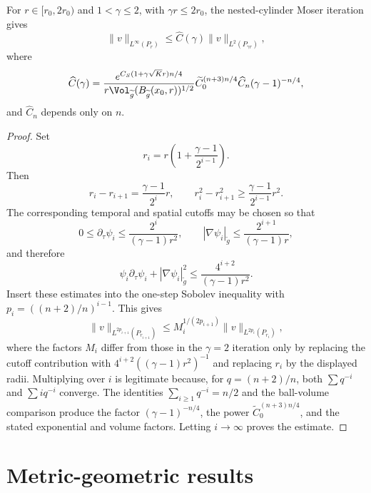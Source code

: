 \begin{proposition}
\label{prop:chow-iii-appj-solution-25-7}
For \(r\in[r_0,2r_0)\) and \(1<\gamma\leq2\), with
\(\gamma r\leq2r_0\), the nested-cylinder Moser iteration gives
\[
 \|v\|_{L^\infty(P_r)}\leq\widehat C(\gamma)
 \|v\|_{L^2(P_{\gamma r})},
\]
where
\[
 \widehat C(\gamma)=
 \frac{e^{C_S(1+\gamma\sqrt K r)n/4}}
 {r\Vol_{\widetilde g}(B_{\widetilde g}(x_0,r))^{1/2}}
 \widetilde C_0^{(n+3)n/4}\widehat C_n(\gamma-1)^{-n/4},
\]
and \(\widehat C_n\) depends only on \(n\).
\end{proposition}
\begin{proof}
\sketch
Set
\[
 r_i=r\left(1+\frac{\gamma-1}{2^{i-1}}\right).
\]
Then
\[
 r_i-r_{i+1}=\frac{\gamma-1}{2^i}r,
 \qquad
 r_i^2-r_{i+1}^2\geq\frac{\gamma-1}{2^{i-1}}r^2.
\]
The corresponding temporal and spatial cutoffs may be chosen so that
\[
 0\leq\partial_\tau\psi_i\leq
 \frac{2^i}{(\gamma-1)r^2},
 \qquad
 |\nabla\psi_i|_{\widetilde g}\leq
 \frac{2^{i+1}}{(\gamma-1)r},
\]
and therefore
\[
 \psi_i\partial_\tau\psi_i+|\nabla\psi_i|_{\widetilde g}^2
 \leq\frac{4^{i+2}}{(\gamma-1)r^2}.
\]
Insert these estimates into the one-step Sobolev inequality with
\(p_i=((n+2)/n)^{i-1}\).  This gives
\[
 \|v\|_{L^{2p_{i+1}}(P_{r_{i+1}})}
 \leq M_i^{1/(2p_{i+1})}
 \|v\|_{L^{2p_i}(P_{r_i})},
\]
where the factors \(M_i\) differ from those in the \(\gamma=2\) iteration
only by replacing the cutoff contribution with
\(4^{i+2}((\gamma-1)r^2)^{-1}\) and replacing \(r_i\) by the displayed
radii.  Multiplying over \(i\) is legitimate because, for
\(q=(n+2)/n\), both \(\sum q^{-i}\) and \(\sum iq^{-i}\) converge.
The identities \(\sum_{i\geq1}q^{-i}=n/2\) and the ball-volume comparison
produce the factor \((\gamma-1)^{-n/4}\), the power
\(\widetilde C_0^{(n+3)n/4}\), and the stated exponential and volume
factors.  Letting \(i\to\infty\) proves the estimate.
\end{proof}

\section{Metric-geometric results}

